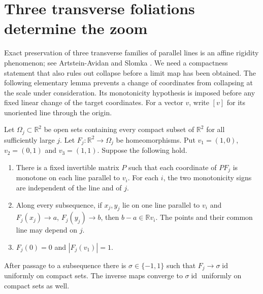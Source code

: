 
\section{Three transverse foliations determine the zoom}\label{sec:zoom}

Exact preservation of three transverse families of parallel lines is
an affine rigidity phenomenon; see Artstein-Avidan and Slomka
\cite{ArtsteinSlomka2017}. We need a compactness statement that also
rules out collapse before a limit map has been obtained.
The following elementary lemma prevents a change of coordinates from
collapsing at the scale under consideration.  Its monotonicity hypothesis
is imposed before any fixed linear change of the target coordinates.
For a vector $v$, write $[v]$ for its unoriented line through the origin.

\begin{lemma}\label{lem:three-foliation}
Let $\Omega_j\subset\mathbb R^2$ be open sets containing every compact
subset of $\mathbb R^2$ for all sufficiently large $j$.  Let
$F_j:\mathbb R^2\longrightarrow\Omega_j$ be homeomorphisms.  Put
$v_1=(1,0)$, $v_2=(0,1)$ and $v_3=(1,1)$.  Suppose the following hold.
\begin{enumerate}
\item There is a fixed invertible matrix $P$ such that each coordinate
of $P F_j$ is monotone on each line parallel to $v_i$.  For each $i$,
the two monotonicity signs are independent of the line and of $j$.
\item Along every subsequence, if $x_j,y_j$ lie on one line parallel to $v_i$ and
$F_j(x_j)\to a$, $F_j(y_j)\to b$, then $b-a\in\mathbb R v_i$.
The points and their common line may depend on $j$.
\item $F_j(0)=0$ and $|F_j(v_1)|=1$.
\end{enumerate}
After passage to a subsequence there is $\sigma\in\{-1,1\}$ such that
$F_j\to \sigma\operatorname{id}$ uniformly on compact sets.  The inverse
maps converge to $\sigma\operatorname{id}$ uniformly on compact sets as
well.
\end{lemma}

